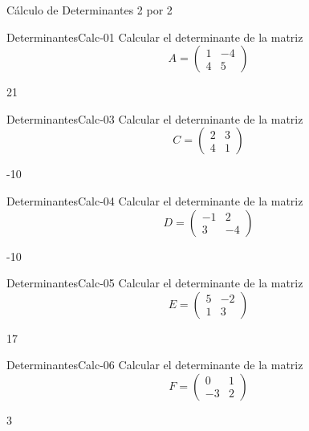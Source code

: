 \documentclass[a4,11pt]{aleph-notas}
\begin{document}
\begin{quiz}{Cálculo de Determinantes 2 por 2}
    
\begin{numerical}[tolerance=0]%
    {DeterminantesCalc-01}
    Calcular el determinante de la matriz 
    \[
        A = \begin{pmatrix}
            1 & -4\\
            4 & 5 
        \end{pmatrix}
    \] 
    \item 21
\end{numerical}

\begin{numerical}[tolerance=0]%
    {DeterminantesCalc-03}
    Calcular el determinante de la matriz 
    \[
        C = \begin{pmatrix}
            2 & 3\\
            4 & 1 
        \end{pmatrix}
    \]
    \item -10
\end{numerical}

\begin{numerical}[tolerance=0]%
    {DeterminantesCalc-04}
    Calcular el determinante de la matriz 
    \[
        D = \begin{pmatrix}
            -1 & 2\\
            3 & -4 
        \end{pmatrix}
    \]
    \item -10
\end{numerical}

\begin{numerical}[tolerance=0]%
    {DeterminantesCalc-05}
    Calcular el determinante de la matriz 
    \[
        E = \begin{pmatrix}
            5 & -2\\
            1 & 3 
        \end{pmatrix}
    \]
    \item 17
\end{numerical}

\begin{numerical}[tolerance=0]%
    {DeterminantesCalc-06}
    Calcular el determinante de la matriz 
    \[
        F = \begin{pmatrix}
            0 & 1\\
            -3 & 2 
        \end{pmatrix}
    \]
    \item 3
\end{numerical}


\end{quiz}
\end{document}
